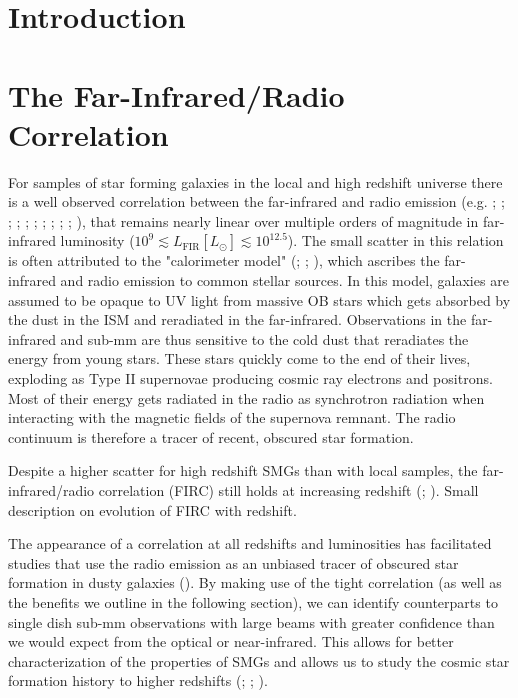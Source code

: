 
\section{Introduction}

\section{The Far-Infrared/Radio Correlation}

For samples of star forming galaxies in the local and high redshift universe there is a well observed correlation between the far-infrared and radio emission (e.g. \citealt{Dickey_1984}; \citealt{deJong_1985}; \citealt{Helou_1985}; \citealt{Condon_1992}; \citealt{Barger_2000}; \citealt{Yun_2001}; \citealt{Garrett_2002}; \citealt{Appleton_2004}; \citealt{Ibar_2008}; \citealt{Seymour_2009}; \citealt{Sargent_2010}), that remains nearly linear over multiple orders of magnitude in far-infrared luminosity ($10^{9} \lesssim L_{\textrm{FIR}} [L_{\odot}] \lesssim 10^{12.5}$). The small scatter in this relation is often attributed to the "calorimeter model" (\citealt{Voelk_1989}; \citealt{Lisenfeld_1996}; \citealt{Lacki_2010}), which ascribes the far-infrared and radio emission to common stellar sources. In this model, galaxies are assumed to be opaque to UV light from massive OB stars which gets absorbed by the dust in the ISM and reradiated in the far-infrared. Observations in the far-infrared and sub-mm are thus sensitive to the cold dust that reradiates the energy from young stars. These stars quickly come to the end of their lives, exploding as Type II supernovae producing cosmic ray electrons and positrons. Most of their energy gets radiated in the radio as synchrotron radiation when interacting with the magnetic fields of the supernova remnant. The radio continuum is therefore a tracer of recent, obscured star formation.

Despite a higher scatter for high redshift SMGs than with local samples, the far-infrared/radio correlation (FIRC) still holds at increasing redshift (\citealt{Ivison_2010a}; \citealt{Ivison_2010b}). {\color{red}Small description on evolution of FIRC with redshift.}

The appearance of a correlation at all redshifts and luminosities has facilitated studies that use the radio emission as an unbiased tracer of obscured star formation in dusty galaxies (\citealt{Kennicutt_2012}). By making use of the tight correlation (as well as the benefits we outline in the following section), we can identify counterparts to single dish sub-mm observations with large beams with greater confidence than we would expect from the optical or near-infrared. This allows for better characterization of the properties of SMGs and allows us to study the cosmic star formation history to higher redshifts (\citealt{Madau_2014}; \citealt{Delhaize_2017}; \citealt{Novak_2017}).

